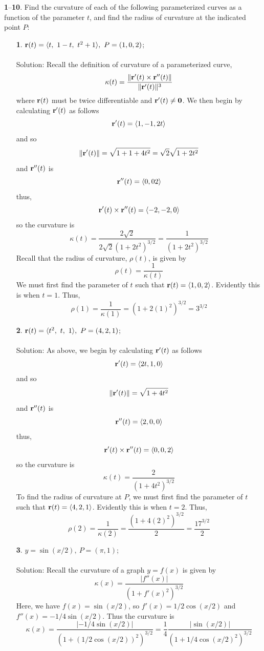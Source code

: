 \documentclass[12pt]{amsbook}
\newcommand{\la}{\langle}
\newcommand{\ra}{\rangle}
\begin{document}
\noindent
{\small {\bf 1}--{\bf 10}}. Find the curvature of each of the following parameterized curves as a
function of the parameter $t$, and find the radius of curvature at the indicated
point $P$:
\begin{enumerate}
  \item[{\small\bf 1}.] ${\bf r}(t)=\la t,\ 1-t ,\  t^2+1 \ra, \ P=(1,0,2)$;
  \\
  \\
  {\sc Solution}: Recall the definition of curvature of a parameterized curve,
  $$\kappa(t)=\frac{\|{\bf r}'(t)\times{\bf r}''(t)\|}{\|{\bf r}'(t)\|^3}$$
  where ${\bf r}(t)$ must be twice differentiable and ${\bf r}'(t)\neq {\bf 0}$. We then begin by calculating ${\bf r}'(t)$ as follows
  $${\bf r}'(t)=\la 1,-1,2t \ra$$
  and so 
  $$\|{\bf r}'(t)\|=\sqrt{1+1+4t^2}=\sqrt{2}\sqrt{1+2t^2}$$
  and ${\bf r}''(t)$ is
  $${\bf r}''(t)=\la 0,0 2\ra$$
  thus,
  $${\bf r}'(t)\times{\bf r}''(t)=\la -2,-2,0\ra$$
  so the curvature is
  $$\kappa(t)=\frac{2\sqrt{2}}{2\sqrt{2}(1+2t^2)^{3/2}}=\frac{1}{(1+2t^2)^{3/2}}$$
  Recall that the radius of curvature, $\rho(t)$, is given by 
  $$\rho(t)=\frac{1}{\kappa(t)}$$
  We must first find the parameter of $t$ such that ${\bf r}(t)=\la 1,0,2 \ra$. Evidently this is when $t=1$. Thus,
  $$\rho(1)=\frac{1}{\kappa(1)}=(1+2(1)^2)^{3/2}=3^{3/2}$$
  \item[{\small\bf 2}.] ${\bf r}(t)=\la t^2,\ t,\ 1 \ra, \ P=(4,2,1)$;
  \\
  \\
  {\sc Solution}: As above, we begin by calculating ${\bf r}'(t)$ as follows
  $${\bf r}'(t)=\la 2t,1,0 \ra$$
  and so 
  $$\|{\bf r}'(t)\|=\sqrt{1+4t^2}$$
  and ${\bf r}''(t)$ is
  $${\bf r}''(t)=\la 2,0, 0\ra$$
  thus,
  $${\bf r}'(t)\times{\bf r}''(t)=\la 0,0,2\ra$$
  so the curvature is
  $$\kappa(t)=\frac{2}{(1+4t^2)^{3/2}}$$
  To find the radius of curvature at $P$, we must first find the parameter of $t$ such that ${\bf r}(t)=\la 4,2,1 \ra$. Evidently this is when $t=2$. Thus,
  $$\rho(2)=\frac{1}{\kappa(2)}=\frac{(1+4(2)^2)^{3/2}}{2}=\frac{17^{3/2}}{2}$$
  \item[{\small\bf 3}.] $y=\sin(x/2), \ P=(\pi,1)$;
  \\
  \\
  {\sc Solution}: Recall the curvature of a graph $y=f(x)$ is given by
  $$\kappa(x)=\frac{|f''(x)|}{(1+f'(x)^2)^{3/2}}$$
  Here, we have $f(x)=\sin(x/2)$, so $f'(x)=1/2\cos(x/2)$ and $f''(x)=-1/4\sin(x/2)$. Thus the curvature is
  $$\kappa(x)=\frac{|-1/4\sin(x/2)|}{(1+(1/2\cos(x/2))^2)^{3/2}}=\frac{1}{4}\frac{|\sin(x/2)|}{(1+1/4\cos(x/2)^2)^{3/2}}$$

\end{enumerate}
\end{document}
